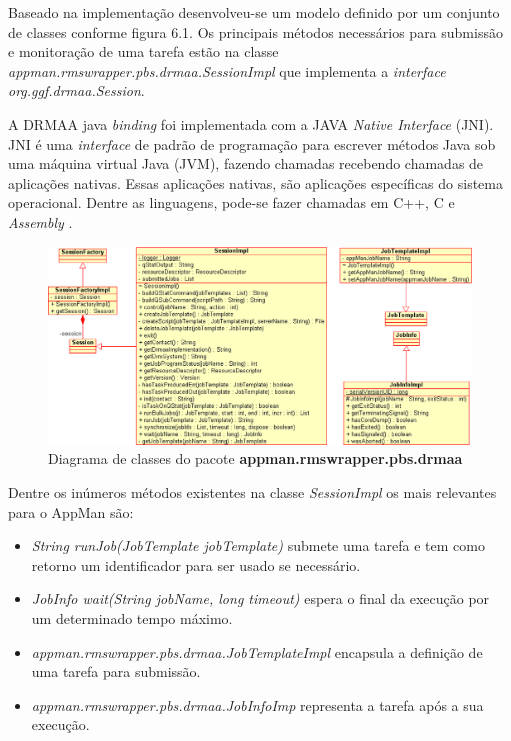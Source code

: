Baseado na implementação desenvolveu-se um modelo definido por um conjunto de classes conforme figura 6.1. Os principais métodos necessários para submissão e monitoração de uma tarefa estão na classe \emph{appman.rmswrapper.pbs.drmaa.SessionImpl} que implementa a \emph{interface} \emph{org.ggf.drmaa.Session}.

A DRMAA java \emph{binding} foi implementada com a JAVA \emph{Native Interface} (JNI). JNI é uma \emph{interface} de padrão de programação para escrever métodos Java sob uma máquina virtual Java (JVM), fazendo chamadas recebendo chamadas de aplicações nativas. Essas aplicações nativas, são aplicações específicas do sistema operacional. Dentre as linguagens, pode-se fazer chamadas em C++, C e \emph{Assembly} \cite{jni}.

\begin{figure}[htb]
\begin{center}
\includegraphics[scale=0.5]{./img/drmaaUML2.eps}
\caption{Diagrama de classes do pacote \textbf{appman.rmswrapper.pbs.drmaa}}
\label{fig:UML_DRMAA}
\end{center}
\end{figure}

Dentre os inúmeros métodos existentes na classe \emph{SessionImpl} os mais relevantes para o AppMan são:

\begin{itemize}
	\item \emph{String runJob(JobTemplate jobTemplate)} submete uma tarefa e tem como retorno um identificador para ser usado se necessário.
	\item \emph{JobInfo wait(String jobName, long timeout)} espera o final da execução por um determinado tempo máximo.
	\item \emph{appman.rmswrapper.pbs.drmaa.JobTemplateImpl} encapsula a definição de uma tarefa para submissão.
	\item \emph{appman.rmswrapper.pbs.drmaa.JobInfoImp} representa a tarefa após a sua execução.
\end{itemize}

